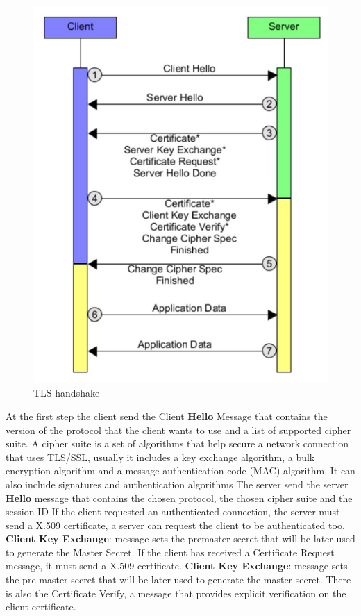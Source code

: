     \begin{figure}[h!]
        \centering
        \includegraphics[scale=0.4]{images/handshakeTls.png}
        \caption{TLS handshake}
        \label{fig:tlsH}
    \end{figure}
    
    \FloatBarrier
    
    At the first step the client send the Client \textbf{Hello} Message that contains the version of the protocol that the client wants to use and a list of supported cipher suite. A cipher suite is a set of algorithms that help secure a network connection that uses TLS/SSL, usually it includes a key exchange algorithm, a bulk encryption algorithm and a message authentication code (MAC) algorithm. It can also include signatures and authentication algorithms
    The server send the server \textbf{Hello} message that contains the chosen protocol, the chosen cipher suite and the session ID
    If the client requested an authenticated connection, the server must send a X.509 certificate, a server can request the client to be authenticated too. \textbf{Client Key Exchange}: message sets the premaster secret that will be later used to generate the Master Secret.
    If the client has received a Certificate Request message, it must send a X.509 certificate. \textbf{Client Key Exchange}: message sets the pre-master secret that will be later used to generate the master secret. There is also the Certificate Verify, a message that provides explicit verification on the client certificate.

